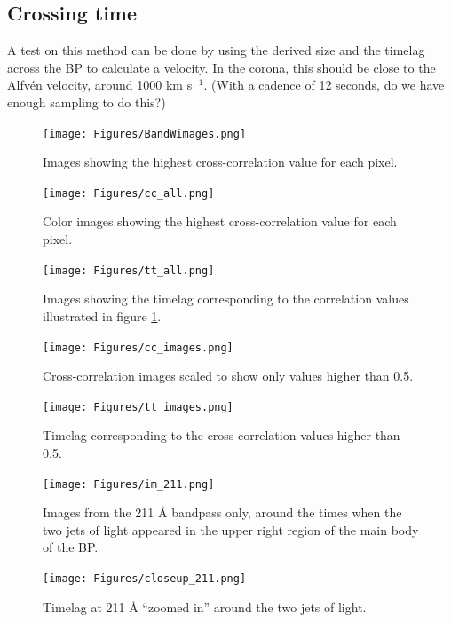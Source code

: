 \documentclass[preprint2]{aastex}
\begin{document}
\subsection{Crossing time}
A test on this method can be done by using the derived size and the timelag across
the BP to calculate a velocity. In the corona, this should be close to the
Alfv\'en velocity, around 1000 km s$^{-1}$. (With a cadence of 12 seconds, do
we have enough sampling to do this?)

\begin{figure}[htb!]
    \texttt{[image: Figures/BandWimages.png]}
    \caption{Images showing the highest cross-correlation value for each pixel. }
    \label{cc_all}
\end{figure}

\begin{figure}[htb!]
    \texttt{[image: Figures/cc\_all.png]}
    \caption{Color images showing the highest cross-correlation value for each pixel. }
    \label{cc_all_color}
\end{figure}

\begin{figure}[htb!]
    \texttt{[image: Figures/tt\_all.png]}
    \caption{Images showing the timelag corresponding to the correlation values
        illustrated in figure \ref{cc_all}.}
    \label{tt_all}
\end{figure}

\begin{figure}[htb!]
    \texttt{[image: Figures/cc\_images.png]}
    \caption{Cross-correlation images scaled to show only values higher than 0.5.}
    \label{cc}
\end{figure}

\begin{figure}[htb!]
    \texttt{[image: Figures/tt\_images.png]}
    \caption{Timelag corresponding to the cross-correlation values higher than 0.5.}
    \label{tt}
\end{figure}

\begin{figure}[htb!]
    \texttt{[image: Figures/im\_211.png]}
    \caption{Images from the 211 \AA{} bandpass only, around the times when the
        two jets of light appeared in the upper right region of the main body of the BP. }
    \label{211_images}
\end{figure}

\begin{figure}[htb!]
    \texttt{[image: Figures/closeup\_211.png]}
    \caption{Timelag at 211 \AA{} ``zoomed in'' around the two jets of light.}
    \label{closeup}
\end{figure}
\end{document}

